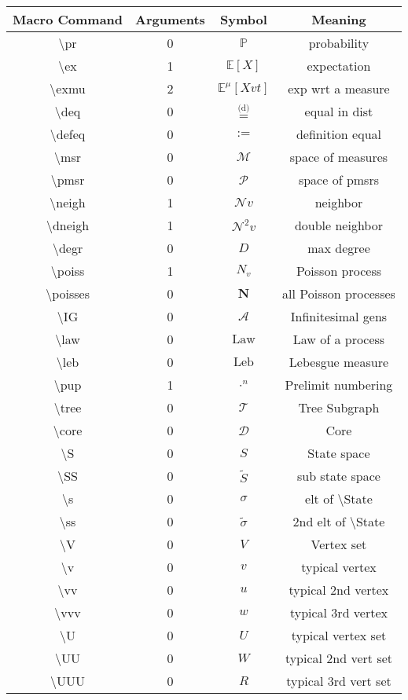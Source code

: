 \documentclass[12pt]{article}
\newcommand{\mb}{\mathbb}
\newcommand{\mc}{\mathcal}
\newcommand{\te}{\text}
\newcommand{\tbs}{\textbackslash}
\newcommand{\pr}{\mb{P}}							%
\newcommand{\ex}[1]{\mb{E}\left[#1\right]}			%
\newcommand{\exmu}[2]{\mb{E}^{#1}\left[#2\right]}	%
\newcommand{\deq}{\overset{\text{(d)}}{=}}			%
\newcommand{\defeq}{:=}								%
\newcommand{\msr}{\mc{M}}							%
\newcommand{\pmsr}{\mc{P}}							%
\renewcommand{\v}{v}							%
\newcommand{\vv}{u}								%
\newcommand{\vvv}{w}							%
\renewcommand{\U}{U}							%
\newcommand{\UU}{W}								%
\newcommand{\UUU}{R}							%
\renewcommand{\S}{S}							%
\newcommand{\s}{\sigma}							%
\renewcommand{\t}{t}							%
\newcommand{\X}{X}								%
\newcommand{\IG}{\mc{A}}						%
\newcommand{\neigh}{\mc{N}}						%
\renewcommand{\ss}[1]{^{#1}}					%
\newcommand{\dneigh}{\mc{N}^2}				%
\newcommand{\degr}{D}								%
\newcommand{\poiss}[1]{N_{#1}}						%
\newcommand{\poisses}{\mathbf{N}}				%
\newcommand{\law}{\te{Law}}							%
\newcommand{\leb}{\te{Leb}}							%
\newcommand{\pup}[1]{^{#1}}							%
\newcommand{\tree}{\mc{T}}							%
\newcommand{\core}{\mc{D}}							%
\renewcommand{\SS}{\tilde{\S}}						%
\renewcommand{\ss}{\tilde{\s}}					%
\newcommand{\m}[3]{\mu_{#2#1}^{#3}}						%
\begin{document}
\begin{longtable}{c|c|c|c}
Macro Command & Arguments & Symbol & Meaning\\\hline
\tbs pr&0&\(\pr\)	& probability\\
\tbs ex&1&\(\ex{X}\)	&expectation\\
\tbs exmu&2&\(\exmu{\m{}{}{}}{\X{\v}{\t}}\)	&exp wrt a measure\\
\tbs deq&0&\(\deq\)		&equal in dist\\
\tbs defeq&0&\(\defeq\)							&definition equal\\
\tbs msr&0&\(\msr\)							&space of measures\\
\tbs pmsr&0&\(\pmsr\)						&space of pmsrs\\
\tbs neigh&1&\(\neigh{\v}\)				&neighbor\\
\tbs dneigh&1&\(\dneigh{\v}\)				&double neighbor\\
\tbs degr&0&\(\degr\)								&max degree\\
\tbs poiss&1&\(\poiss{\v}\)						&Poisson process\\
\tbs poisses&0&\(\poisses\)					&all Poisson processes\\
\tbs IG&0&\(\IG\)					&Infinitesimal gens\\
\tbs law&0&\(\law\)							&Law of a process\\
\tbs leb&0&\(\leb\)							&Lebesgue measure\\
\tbs pup&1&\(\cdot\pup{n}\)						&Prelimit numbering\\
\tbs tree&0&\(\tree\)							&Tree Subgraph\\
\tbs core&0&\(\core\)							&Core\\
\tbs S&0&\(\S\)							&State space\\
\tbs SS&0&\(\SS\)						&sub state space\\
\tbs s&0&\(\s\)								&elt of \tbs State\\
\tbs ss&0&\(\ss\)						&2nd elt of \tbs State\\
\tbs V&0&\( V\)									&Vertex set\\
\tbs v&0&\(\v\)								&typical vertex\\
\tbs vv&0&\(\vv\)									&typical 2nd vertex\\
\tbs vvv&0&\(\vvv\)								&typical 3rd vertex\\
\tbs U&0&\(\U\)									&typical vertex set\\
\tbs UU&0&\(\UU\)								&typical 2nd vert set\\
\tbs UUU&0&\(\UUU\)								&typical 3rd vert set\\

\end{longtable}
\end{document}
